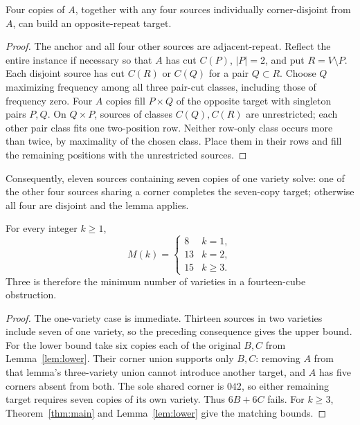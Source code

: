 \begin{lemma}\label{lem:disjoint-pair}
Four copies of $A$, together with any four sources individually
corner-disjoint from $A$, can build an opposite-repeat target.
\end{lemma}
\begin{proof}
The anchor and all four other sources are adjacent-repeat. Reflect the entire instance
if necessary so that $A$ has cut $C(P)$, $|P|=2$, and put $R=V\setminus P$.
Each disjoint source has cut $C(R)$ or $C(Q)$ for a pair $Q\subset R$.
Choose $Q$ maximizing frequency among all three pair-cut classes,
including those of frequency zero. Four $A$ copies fill
$P\times Q$ of the opposite target with singleton pairs $P,Q$.
On $Q\times P$, sources of classes $C(Q),C(R)$ are unrestricted; each other
pair class fits one two-position row. Neither row-only class occurs more
than twice, by maximality of the chosen class. Place them in their rows
and fill the remaining positions with the unrestricted sources.
\end{proof}

Consequently, eleven sources containing seven copies of one variety solve:
one of the other four sources sharing a corner completes the seven-copy
target; otherwise all four are disjoint and the lemma applies.

\begin{samepage}
\begin{theorem}\label{thm:support}
For every integer $k\ge1$,
\[
 M(k)=\begin{cases}8&k=1,\\13&k=2,\\15&k\ge3.\end{cases}
\]
Three is therefore the minimum number of varieties in a fourteen-cube obstruction.
\end{theorem}
\end{samepage}
\begin{proof}
The one-variety case is immediate. Thirteen sources in two varieties include
seven of one variety, so the preceding consequence gives the upper bound.
For the lower bound take six copies each of the original $B,C$ from
Lemma~\ref{lem:lower}. Their corner union supports only $B,C$: removing
$A$ from that lemma's three-variety union cannot introduce another target,
and $A$ has five corners absent from both. The sole shared corner is $042$,
so either remaining target requires seven copies of its own variety.
Thus $6B+6C$ fails. For $k\ge3$, Theorem~\ref{thm:main} and
Lemma~\ref{lem:lower} give the matching bounds.
\end{proof}


